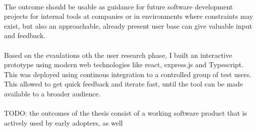 \\
The outcome should be usable as guidance for future software development projects for internal tools at companies or in environments where constraints may exist, but also an approachable, already present user base can give valuable input and feedback.
\\\\
Based on the evaulations oth the user research phase, I built an interactive prototype using modern web technologies like react, express.js and Typescript.
This was deployed using continous integration to a controlled group of test users. This allowed to get quick feedback and iterate fast, until the tool can be made available to a broader audience.
\\\\
TODO: the outcomes of the thesis consist of a working software product that is actively used by early adopters, as well 

\cleardoublepage
